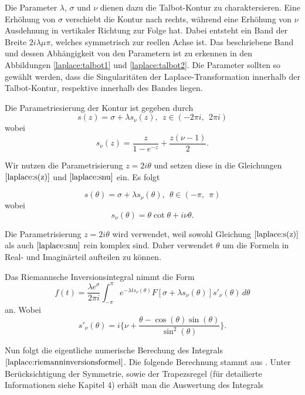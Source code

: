 Die Parameter $\lambda$, $\sigma$ und $\nu$ dienen dazu die
Talbot-Kontur zu charaktersieren. Eine Erhöhung von $\sigma$ verschiebt
die Kontur nach rechts, während eine Erhöhung von $\nu$ Ausdehnung
in vertikaler Richtung zur Folge hat. Dabei entsteht ein Band der Breite $2i\lambda\mu\pi$, welches symmetrisch zur reellen Achse ist. Das beschriebene Band und dessen Abhängigkeit von den Parametern ist zu erkennen in den Abbildungen \ref{laplace:talbot1} und \ref{laplace:talbot2}. Die Parameter sollten so gewählt werden, dass die Singularitäten der Laplace-Transformation innerhalb der Talbot-Kontur, respektive innerhalb des Bandes liegen. 


Die Parametriesierung der Kontur ist gegeben durch
\begin{equation}
s(z) = \sigma+\lambda s_{\nu}(z),~~ z\in (-2\pi i,~~2\pi i)
\label{laplace:s(z)}
\end{equation}
wobei
\begin{equation}
s_{\nu}(z)=\frac{z}{1-e^{-z}}+\frac{z(\nu-1)}{2}.
\label{laplace:snu}
\end{equation}

Wir nutzen die Parametrisierung $z=2i\theta$ und setzen diese in die Gleichungen $\eqref{laplace:s(z)}$ und $\eqref{laplace:snu}$ ein. Es folgt

\begin{equation}
s(\theta) = \sigma+\lambda s_{\nu}(\theta),~~ \theta\in (-\pi ,~~\pi)
\end{equation}
wobei
\begin{equation}
s_{\nu}(\theta)=\theta \cot\theta+i\nu\theta.
\end{equation}

Die Parametrisierung $z=2i\theta$ wird verwendet, weil sowohl Gleichung $\eqref{laplace:s(z)}$ als auch $\eqref{laplace:snu}$ rein komplex sind. Daher verwendet $\theta$ um die Formeln in Real- und Imaginärteil aufteilen zu können.

Das Riemannsche Inversionsintegral nimmt die Form 
\begin{equation}
f(t)=\frac{\lambda e^{\sigma}}{2\pi i}\int_{-\pi}^{\pi} e^{-\lambda ts_{\nu}(\theta)}F[\sigma + \lambda s_{\nu}(\theta)]s'_{\nu}(\theta)\,d\theta
\end{equation}
an.
Wobei
\begin{equation}
s'_{\nu}(\theta) = i \Biggl\{\nu + \frac{\theta-\cos(\theta)\sin(\theta)}{\sin^{2}(\theta)}  \Biggr\}.
\end{equation}


Nun folgt die eigentliche numerische Berechung des Integrals $\eqref{laplace:riemanninversionsformel}$. Die folgende Berechnung stammt aus \cite{laplace:talbot}. Unter Berücksichtigung der Symmetrie, sowie der Trapezsregel (für detailierte Informationen siehe Kapitel 4) erhält man die Auswertung des Integrals

